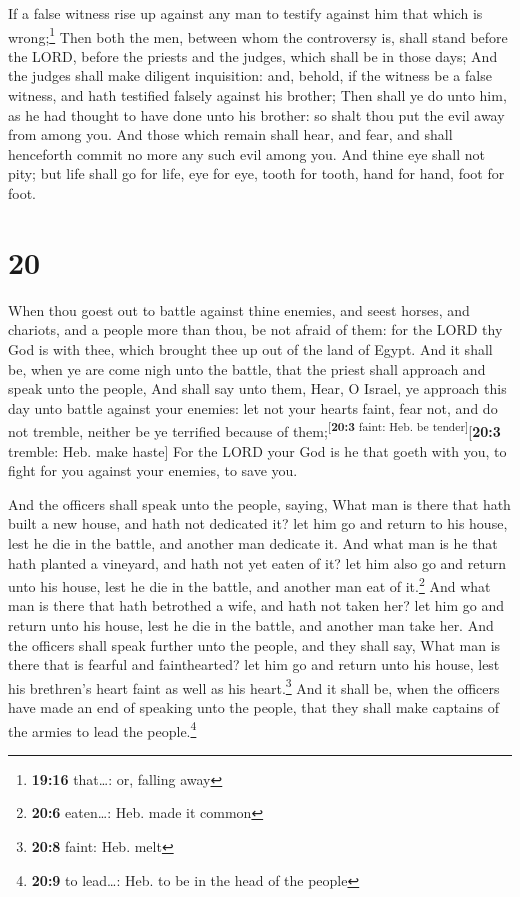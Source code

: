  If a false witness rise up against any man to testify
against him that which is wrong;\footnote{\textbf{19:16} that\ldots: or,
  falling away}  Then both the men, between whom the
controversy is, shall stand before the LORD, before the priests and the
judges, which shall be in those days;  And the judges
shall make diligent inquisition: and, behold, if the witness be a false
witness, and hath testified falsely against his brother; 
Then shall ye do unto him, as he had thought to have done unto his
brother: so shalt thou put the evil away from among you. 
And those which remain shall hear, and fear, and shall henceforth commit
no more any such evil among you.  And thine eye shall not
pity; but life shall go for life, eye for eye, tooth for tooth, hand for
hand, foot for foot.

\hypertarget{section-19}{%
\section{20}\label{section-19}}

 When thou goest out to battle against thine enemies, and
seest horses, and chariots, and a people more than thou, be not afraid
of them: for the LORD thy God is with thee, which brought thee up out of
the land of Egypt.  And it shall be, when ye are come nigh
unto the battle, that the priest shall approach and speak unto the
people,  And shall say unto them, Hear, O Israel, ye
approach this day unto battle against your enemies: let not your hearts
faint, fear not, and do not tremble, neither be ye terrified because of
them;\textsuperscript{{[}\textbf{20:3} faint: Heb. be
tender{]}}{[}\textbf{20:3} tremble: Heb. make haste{]} 
For the LORD your God is he that goeth with you, to fight for you
against your enemies, to save you.

 And the officers shall speak unto the people, saying,
What man is there that hath built a new house, and hath not dedicated
it? let him go and return to his house, lest he die in the battle, and
another man dedicate it.  And what man is he that hath
planted a vineyard, and hath not yet eaten of it? let him also go and
return unto his house, lest he die in the battle, and another man eat of
it.\footnote{\textbf{20:6} eaten\ldots: Heb. made it common}
 And what man is there that hath betrothed a wife, and
hath not taken her? let him go and return unto his house, lest he die in
the battle, and another man take her.  And the officers
shall speak further unto the people, and they shall say, What man is
there that is fearful and fainthearted? let him go and return unto his
house, lest his brethren's heart faint as well as his heart.\footnote{\textbf{20:8}
  faint: Heb. melt}  And it shall be, when the officers
have made an end of speaking unto the people, that they shall make
captains of the armies to lead the people.\footnote{\textbf{20:9} to
  lead\ldots: Heb. to be in the head of the people}

